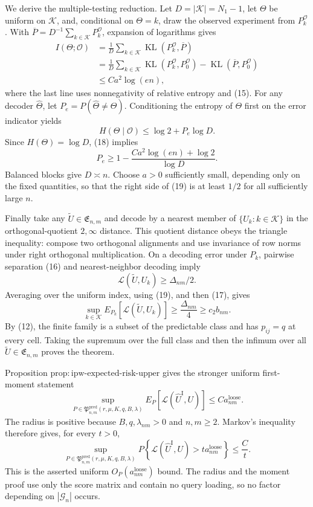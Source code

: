 We derive the multiple-testing reduction.  Let \(D=|\mathcal K|=N_1-1\), let \(\Theta\) be uniform on \(\mathcal K\), and, conditional on \(\Theta=k\), draw the observed experiment from \(P_k^{\mathcal O}\).  With \(\overline P=D^{-1}\sum_{k\in\mathcal K}P_k^{\mathcal O}\), expansion of logarithms gives
\[
 \begin{aligned}
 I(\Theta;\mathcal O)
 &=\frac1D\sum_{k\in\mathcal K}\operatorname{KL}(P_k^{\mathcal O},\overline P)\\
 &=\frac1D\sum_{k\in\mathcal K}\operatorname{KL}(P_k^{\mathcal O},P_0^{\mathcal O})
  -\operatorname{KL}(\overline P,P_0^{\mathcal O})\\
 &\le Ca^2\log(en),
 \end{aligned}
 \tag{18}
\]
where the last line uses nonnegativity of relative entropy and (15).  For any decoder \(\widehat\Theta\), let \(P_e=P(\widehat\Theta\ne\Theta)\).  Conditioning the entropy of \(\Theta\) first on the error indicator yields
\[
 H(\Theta\mid\mathcal O)\le\log2+P_e\log D.
\]
Since \(H(\Theta)=\log D\), (18) implies
\[
 P_e\ge1-\frac{Ca^2\log(en)+\log2}{\log D}.
 \tag{19}
\]
Balanced blocks give \(D\asymp n\).  Choose \(a>0\) sufficiently small, depending only on the fixed quantities, so that the right side of (19) is at least \(1/2\) for all sufficiently large \(n\).

Finally take any \(\widetilde U\in\mathfrak E_{n,m}\) and decode by a nearest member of \(\{U_k:k\in\mathcal K\}\) in the orthogonal-quotient \(2,\infty\) distance.  This quotient distance obeys the triangle inequality: compose two orthogonal alignments and use invariance of row norms under right orthogonal multiplication.  On a decoding error under \(P_k\), pairwise separation (16) and nearest-neighbor decoding imply
\[
 \mathcal L(\widetilde U,U_k)\ge\Delta_{nm}/2.
\]
Averaging over the uniform index, using (19), and then (17), gives
\[
 \sup_{k\in\mathcal K}E_{P_k}[\mathcal L(\widetilde U,U_k)]
 \ge\frac{\Delta_{nm}}4
 \ge c_2b_{nm}.
\]
By (12), the finite family is a subset of the predictable class and has \(p_{ij}=q\) at every cell.  Taking the supremum over the full class and then the infimum over all \(\widetilde U\in\mathfrak E_{n,m}\) proves the theorem.

Proposition \(\mathrm{prop:ipw\mbox{-}expected\mbox{-}risk\mbox{-}upper}\) gives the stronger uniform first-moment statement
\[
 \sup_{P\in\mathfrak P^{\mathrm{pred}}_{n,m}(r,\mu,K,q,B,\lambda)}
 E_P\!\left[\mathcal L(\widehat U^{\mathrm I},U)\right]
 \le C a^{\mathrm{loose}}_{nm}.
\]
The radius is positive because \(B,q,\lambda_{nm}>0\) and \(n,m\ge2\).  Markov's inequality therefore gives, for every \(t>0\),
\[
 \sup_{P\in\mathfrak P^{\mathrm{pred}}_{n,m}(r,\mu,K,q,B,\lambda)}
 P\!\left\{\mathcal L(\widehat U^{\mathrm I},U)>
 t a^{\mathrm{loose}}_{nm}\right\}\le \frac Ct.
\]
This is the asserted uniform \(O_P(a^{\mathrm{loose}}_{nm})\) bound.  The radius and the moment proof use only the score matrix and contain no query loading, so no factor depending on \(|\mathcal G_n|\) occurs.

